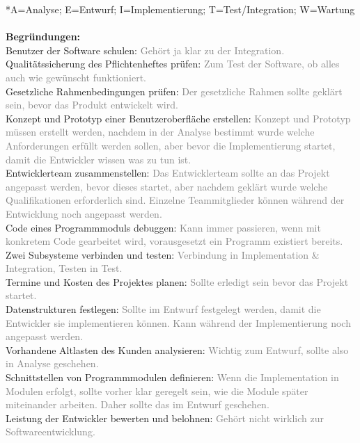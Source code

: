 \documentclass[a4paper,11pt]{scrartcl}
\begin{document}
	*A=Analyse; E=Entwurf; I=Implementierung; T=Test/Integration; W=Wartung\\
	\\\textbf{Begründungen:}\\
	Benutzer der Software schulen: \textcolor{gray}{Gehört ja klar zu der Integration.}\\
	Qualitätssicherung des Pflichtenheftes prüfen: \textcolor{gray}{Zum Test der Software, ob alles auch wie gewünscht funktioniert.}\\
	Gesetzliche Rahmenbedingungen prüfen: \textcolor{gray}{Der gesetzliche Rahmen sollte geklärt sein, bevor das Produkt entwickelt wird.}\\
	Konzept und Prototyp einer Benutzeroberfläche erstellen: \textcolor{gray}{Konzept und Prototyp müssen erstellt werden, nachdem in der Analyse bestimmt wurde welche Anforderungen erfüllt werden sollen, aber bevor die Implementierung startet, damit die Entwickler wissen was zu tun ist.} \\
	Entwicklerteam zusammenstellen: \textcolor{gray}{Das Entwicklerteam sollte an das Projekt angepasst werden, bevor dieses startet, aber nachdem geklärt wurde welche Qualifikationen erforderlich sind. Einzelne Teammitglieder können während der Entwicklung noch angepasst werden.}\\
	Code eines Programmmoduls debuggen: \textcolor{gray}{Kann immer passieren, wenn mit konkretem Code gearbeitet wird, vorausgesetzt ein Programm existiert bereits.}\\			
 	Zwei Subsysteme verbinden und testen: \textcolor{gray}{Verbindung in Implementation \& Integration, Testen in Test.}\\			
 	Termine und Kosten des Projektes planen: \textcolor{gray}{Sollte erledigt sein bevor das Projekt startet.}\\		
	Datenstrukturen festlegen: \textcolor{gray}{Sollte im Entwurf festgelegt werden, damit die Entwickler sie implementieren können. Kann während der Implementierung noch angepasst werden.}\\				
	Vorhandene Altlasten des Kunden analysieren: \textcolor{gray}{Wichtig zum Entwurf, sollte also in Analyse geschehen.}\\			
	Schnittstellen von Programmmodulen definieren: \textcolor{gray}{Wenn die Implementation in Modulen erfolgt, sollte vorher klar geregelt sein, wie die Module später miteinander arbeiten. Daher sollte das im Entwurf geschehen.}\\			
	Leistung der Entwickler bewerten und belohnen: \textcolor{gray}{Gehört nicht wirklich zur Softwareentwicklung.}\\
\end{document}
